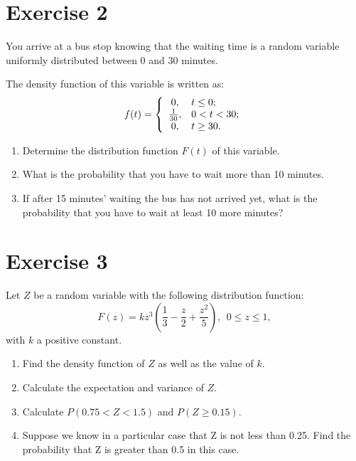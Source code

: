 \documentclass[12pt,thmsa]{article}\usepackage[]{graphicx}\usepackage[]{color}
\begin{document}
\section*{Exercise 2}

You arrive at a bus stop knowing that the waiting time is a random variable uniformly distributed between 0 and 30 minutes.

\medskip

\noindent The density function of this variable is written as:
 $$
 f (t) = \left\{ \begin{array}{cl}
 0 , & t \le 0;\\
 {1\over 30} , & 0 < t < 30;\\
 0 , & t \ge 30.
 \end{array} \right.
 $$
\smallskip

 \begin{enumerate}%
 \item Determine the distribution function $F(t)$ of this variable.
 \item What is the probability that you have to wait more than 10 minutes.
 \item If after 15 minutes' waiting the bus has not arrived yet, what is the probability that you have to wait at least 10 more minutes?
 \end{enumerate}



\section*{Exercise 3}


Let $Z$ be a random variable with the following distribution function:
$$
F(z)=k z^{3} \left (\frac{1}{3} - \frac{z}{2} + \frac{z^{2}}{5} \right ), \ \ 0 \leq z \leq 1,
$$
with $k$ a positive constant.
\medskip

\begin{enumerate}%
\item {Find the density function of $Z$ as well as the value of $k$.}
\item {Calculate the expectation and variance of $Z$.}
\item {Calculate $P(0.75 < Z < 1.5)$ and $P(Z \geq 0.15)$.}
\item Suppose we know in a particular case that Z is not less than 0.25. Find the probability that Z is greater than 0.5 in this case.

\end{enumerate}
\end{document}
